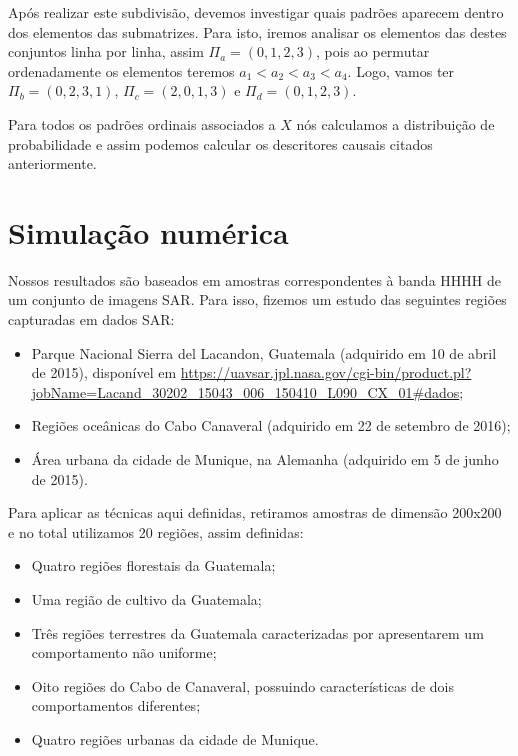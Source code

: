 \documentclass[12pt]{article}
\begin{document}
Após realizar este subdivisão, devemos investigar quais padrões aparecem dentro dos elementos das submatrizes. Para isto, iremos analisar os elementos das destes conjuntos linha por linha, assim $\Pi_{a} = (0,1,2,3)$, pois ao permutar ordenadamente os elementos teremos $a_{1} < a_{2} < a_{3} < a_{4}$. Logo, vamos ter $\Pi_{b} = (0,2,3,1)$, $\Pi_{c} = (2,0,1,3)$ e $\Pi_{d} = (0,1,2,3)$. 

Para todos os padrões ordinais associados a $X$ nós calculamos a distribuição de probabilidade e assim podemos calcular os descritores causais citados anteriormente.

\section{Simulação numérica}

Nossos resultados são baseados em amostras correspondentes à banda HHHH de um conjunto de imagens SAR. Para isso, fizemos um estudo das seguintes regiões capturadas em dados SAR:

\begin{itemize}
    \item Parque Nacional Sierra del Lacandon, Guatemala (adquirido em 10 de abril de 2015), disponível em \url{https://uavsar.jpl.nasa.gov/cgi-bin/product.pl?jobName=Lacand_30202_15043_006_150410_L090_CX_01#dados};
    \item Regiões oceânicas do Cabo Canaveral (adquirido em 22 de setembro de 2016);
    \item Área urbana da cidade de Munique, na Alemanha (adquirido em 5 de junho de 2015).
\end{itemize}

Para aplicar as técnicas aqui definidas, retiramos amostras de dimensão 200x200 e no total utilizamos 20 regiões, assim definidas:  

\begin{itemize}
    \item Quatro regiões florestais da Guatemala;
    \item Uma região de cultivo da Guatemala;
    \item Três regiões terrestres da Guatemala caracterizadas por apresentarem um comportamento não uniforme;
    \item Oito regiões do Cabo de Canaveral, possuindo características de dois comportamentos diferentes;
    \item Quatro regiões urbanas da cidade de Munique.
\end{itemize}
\end{document}
